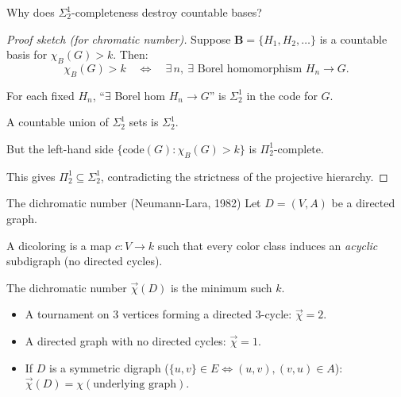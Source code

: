\documentclass[aspectratio=169, 12pt]{beamer}
\begin{document}
\begin{frame}{Why does $\Sigma^1_2$-completeness destroy countable bases?}
\begin{proof}[Proof sketch (for chromatic number)]
Suppose $\mathbf{B} = \{H_1, H_2, \ldots\}$ is a countable basis for $\chi_B(G) > k$. Then:
$$
\chi_B(G) > k
\quad\Longleftrightarrow\quad
\exists\, n,\ \exists\text{ Borel homomorphism } H_n \to G.
$$

\medskip

For each fixed $H_n$, ``$\exists$ Borel hom $H_n \to G$'' is $\Sigma^1_2$ in the code for $G$.

\medskip

A countable union of $\Sigma^1_2$ sets is $\Sigma^1_2$.

\medskip

But the left-hand side $\{\text{code}(G) : \chi_B(G) > k\}$ is $\Pi^1_2$-complete.

\medskip

This gives $\Pi^1_2 \subseteq \Sigma^1_2$, contradicting the strictness of the projective hierarchy.
\end{proof}
\end{frame}


\begin{frame}{The dichromatic number (Neumann-Lara, 1982)}
Let $D = (V, A)$ be a directed graph.

\medskip

A \alert{dicoloring} is a map $c\colon V \to k$ such that every color class induces an \emph{acyclic} subdigraph (no directed cycles).

\medskip

The \alert{dichromatic number} $\vec\chi(D)$ is the minimum such $k$.

\pause
\medskip

\begin{example}
\begin{itemize}
	\item A tournament on 3 vertices forming a directed 3-cycle: $\vec\chi = 2$.
	\item A directed graph with no directed cycles: $\vec\chi = 1$.
	\item If $D$ is a symmetric digraph ($\{u,v\} \in E \Leftrightarrow (u,v),(v,u) \in A$): $\vec\chi(D) = \chi(\text{underlying graph})$.
\end{itemize}
\end{example}
\end{frame}
\end{document}
